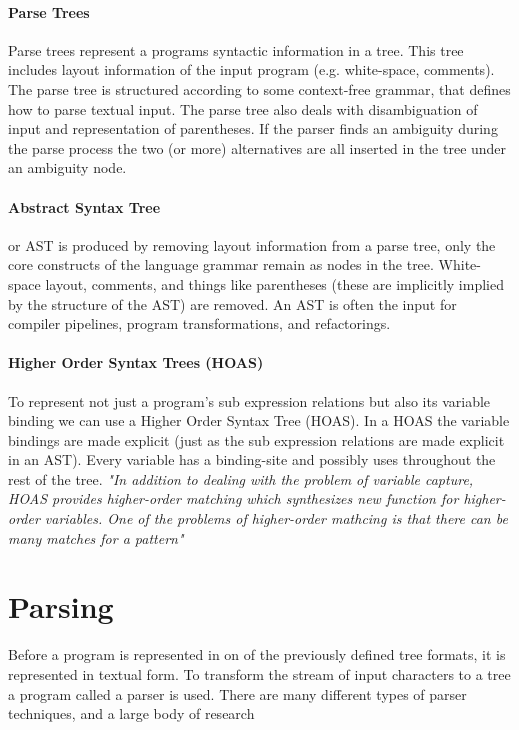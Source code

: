 \paragraph{Parse Trees} 
Parse trees represent a programs syntactic information in a tree. This tree includes layout information of the input program (e.g. white-space, comments). The parse tree is structured according to some context-free grammar, that defines how to parse textual input. The parse tree also deals with disambiguation of input and representation of parentheses. If the parser finds an ambiguity during the parse process the two (or more) alternatives are all inserted in the tree under an ambiguity node.

\paragraph{Abstract Syntax Tree}
or AST is produced by removing layout information from a parse tree, only the core constructs of the language grammar remain as nodes in the tree. White-space layout, comments, and things like parentheses (these are implicitly implied by the structure of the AST) are removed. An AST is often the input for compiler pipelines, program transformations, and refactorings.

\paragraph{Higher Order Syntax Trees (HOAS)}
To represent not just a program's sub expression relations but also its variable binding we can use a Higher Order Syntax Tree (HOAS)\cite{Pfenning1988}. In a HOAS the variable bindings are made explicit (just as the sub expression relations are made explicit in an AST). Every variable has a binding-site and possibly uses throughout the rest of the tree. \textit{"In addition to dealing with the problem of variable capture, HOAS provides higher-order matching which synthesizes new function for higher-order  variables. One of the problems of higher-order mathcing is that there can be many matches for a pattern"}\cite{Visser2001}

\section{Parsing}
Before a program is represented in on of the previously defined tree formats, it is represented in textual form. To transform the stream of input characters to a tree a program called a parser is used. There are many different types of parser techniques, and a large body of research\cite{Visser1997,Brand2002,Salomon1989}


